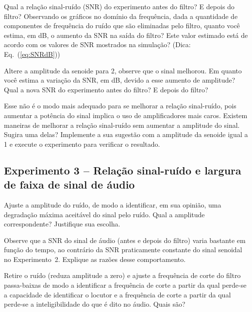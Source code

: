 \documentclass[12pt,addpoints]{exam}
\begin{document}
\begin{questions}
    \question Qual a relação sinal-ruído (SNR) do experimento antes do filtro? E depois do filtro? Observando os gráficos no domínio da frequência, dada a quantidade de componentes de frequência do ruído que são eliminadas pelo filtro, quanto você estima, em dB, o aumento da SNR na saída do filtro? Este valor estimado está de acordo com os valores de SNR mostrados na simulação? (Dica: Eq.~(\ref{eq:SNRdB}))
    \fillwithlines{0.75in}
    
    \question Altere a amplitude da senoide para 2, observe que o sinal melhorou. Em quanto você estima a variação da SNR, em dB, devido a esse aumento de amplitude? Qual a nova SNR do experimento antes do filtro? E depois do filtro?
    \fillwithlines{0.5in}
    
    \question Esse não é o modo mais adequado para se melhorar a relação sinal-ruído, pois aumentar a potência do sinal implica o uso de amplificadores mais caros. Existem maneiras de melhorar a relação sinal-ruído sem aumentar a amplitude do sinal. Sugira uma delas? Implemente a sua sugestão com a amplitude da senoide igual a 1 e execute o experimento para verificar o resultado.
    \fillwithlines{0.5in}
\end{questions}

\subsection*{Experimento 3 -- Relação sinal-ruído e largura de faixa de sinal de áudio}

\begin{questions}
    \question Ajuste a amplitude do ruído, de modo a identificar, em sua opinião, uma degradação máxima aceitável do sinal pelo ruído. Qual a amplitude correspondente? Justifique sua escolha.
    \fillwithlines{0.75in}
    
    \question Observe que a SNR do sinal de áudio (antes e depois do filtro) varia bastante em função do tempo, ao contrário da SNR praticamente constante do sinal senoidal no Experimento~2. Explique as razões desse comportamento.
    \fillwithlines{0.75in}
    
    \question Retire o ruído (reduza amplitude a zero) e ajuste a frequência de corte do filtro passa-baixas de modo a identificar a frequência de corte a partir da qual perde-se a capacidade de identificar o locutor e a frequência de corte a partir da qual perde-se a inteligibilidade do que é dito no áudio. Quais são?
    \fillwithlines{0.5in}
\end{questions}
\end{document}
